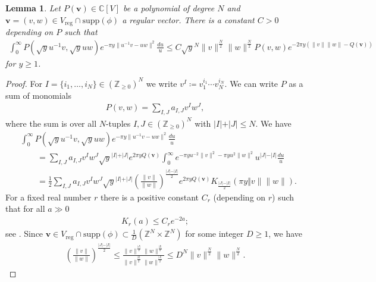 \documentclass[twoside,a4paper,10pt]{article} %
\newcommand{\8}{\infty}
\newcommand{\Z}{\mathbb{Z}}
\newcommand{\vbf}{\mathbf{v}}
\newcommand{\C}{\mathbb{C}}
\newcommand{\reg}{\mathrm{reg}}
\newcommand{\supp}{\mathrm{supp}}
\theoremstyle{mytheoremstyle}
\newtheorem{lem}[thm]{Lemma}
\theoremstyle{remark}
\numberwithin{equation}{section}
\begin{document}
\begin{lem}\label{lemmapolynomial} Let $P(\vbf) \in \C[V]$ be a polynomial of degree $N$ and $\vbf=(v,w) \in V_\reg \cap \supp(\phi)$ a regular vector. There is a constant $C>0$ depending on $P$ such that
\begin{align}
\int_0^\8   P(\sqrt{y}u^{-1}v,\sqrt{y}uw) e^{-\pi y \lVert u^{-1}v-uw \rVert^2} \frac{du}{u} \leq  C \sqrt{y}^{N}\lVert v \rVert^{\frac{N}{2}} \lVert w \rVert^{\frac{N}{2}} P(v,w) e^{-2\pi y \left ( \lVert v \rVert \lVert w \rVert-Q(\vbf) \right ) }
\end{align}
for $y \geq 1$.
\end{lem}
\begin{proof}
For $I=\{i_1, \dots,i_N\} \in (\Z_{\geq 0})^N$ we write $v^I \coloneqq v_1^{i_1} \cdots v_N^{i_N}$. We can write $P$ as a sum of monomials
\begin{align}
P(v,w)=\sum_{I,J} a_{I,J}v^Iw^J,
\end{align} 
where the sum is over all $N$-tuples $I,J \in (\Z_{\geq 0})^N$ with $\vert I \vert+\vert J \vert \leq N$.
We have
\begin{align}
& \int_0^\8   P(\sqrt{y}u^{-1}v,\sqrt{y}uw) e^{-\pi y \lVert u^{-1}v-uw \rVert^2} \frac{du}{u} \\
&\qquad = \sum_{I,J} a_{I,J}v^Iw^J \sqrt{y}^{\vert I \vert+\vert J \vert} e^{2 \pi y Q(\vbf)}\int_0^\8  e^{-\pi y u^{-2}\lVert v \rVert^2-\pi yu^2 \lVert w \rVert^2} u^{\vert J \vert-\vert I \vert}\frac{du}{u} \\
&\qquad = \frac{1}{2}\sum_{I,J} a_{I,J}v^Iw^J \sqrt{y}^{\vert I \vert+\vert J \vert}  \left ( \frac{\lVert v \rVert}{\lVert w \rVert} \right )^{\frac{\vert J \vert-\vert I \vert}{2}} e^{2 \pi y Q(\vbf)} K_{\frac{\vert J \vert-\vert I \vert}{2}}(\pi y \Vert v \rVert \lVert w \rVert).
\end{align}
For a fixed real number  $r$ there is a positive constant $C_r$ (depending on $r$) such that for all $a \gg 0$
\begin{align}
K_{r}(a) \leq C_re^{-2a};
\end{align}
see \cite[K7 p.~271]{langelliptic}. Since $\vbf \in V_\reg \cap \supp(\phi) \subset \frac{1}{D}(\Z^N \times \Z^N)$ for some integer $D \geq 1$, we have
\begin{align}
\left ( \frac{\lVert v \rVert}{\lVert w \rVert} \right )^{\frac{\vert J \vert-\vert I \vert}{2}} \leq \frac{\lVert v \rVert^\frac{\vert J \vert}{2} \lVert w \rVert^\frac{\vert I \vert}{2}}{\lVert v \rVert^\frac{\vert I \vert}{2} \lVert w \rVert^\frac{\vert J \vert}{2}}\leq D^N \lVert v \rVert^{\frac{N}{2}} \lVert w \rVert^{\frac{N}{2}}.
\end{align}  
\end{proof}
\end{document}

